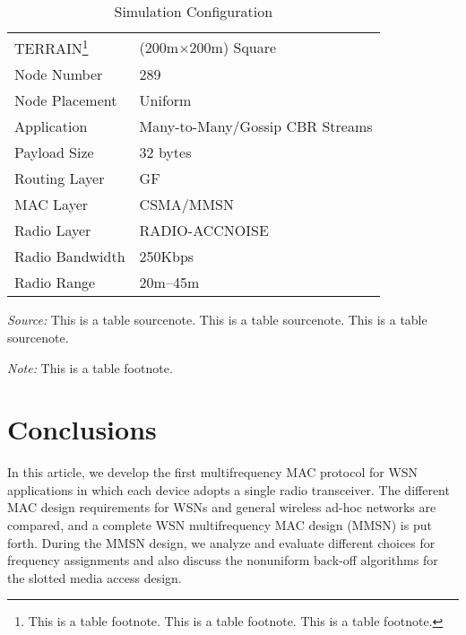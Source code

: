 \documentclass[acmtog, authorversion]{acmart}
\begin{document}
\begin{table}%
\caption{Simulation Configuration}
\label{tab:one}
\begin{minipage}{\columnwidth}
\begin{center}
\begin{tabular}{ll}
  \toprule
  TERRAIN\footnote{This is a table footnote. This is a
    table footnote. This is a table footnote.}   & (200m$\times$200m) Square\\
  Node Number     & 289\\
  Node Placement  & Uniform\\
  Application     & Many-to-Many/Gossip CBR Streams\\
  Payload Size    & 32 bytes\\
  Routing Layer   & GF\\
  MAC Layer       & CSMA/MMSN\\
  Radio Layer     & RADIO-ACCNOISE\\
  Radio Bandwidth & 250Kbps\\
  Radio Range     & 20m--45m\\
  \bottomrule
\end{tabular}
\end{center}
\bigskip\centering
\footnotesize\emph{Source:} This is a table
 sourcenote. This is a table sourcenote. This is a table
 sourcenote.

 \emph{Note:} This is a table footnote.
\end{minipage}
\end{table}%


\section{Conclusions}

In this article, we develop the first multifrequency MAC protocol for
WSN applications in which each device adopts a
single radio transceiver. The different MAC design requirements for
WSNs and general wireless ad-hoc networks are
compared, and a complete WSN multifrequency MAC design (MMSN) is
put forth. During the MMSN design, we analyze and evaluate different
choices for frequency assignments and also discuss the nonuniform
back-off algorithms for the slotted media access design.

\end{document}
